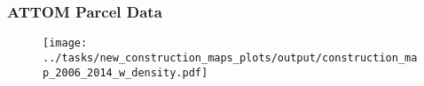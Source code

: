 \begin{frame}
    \frametitle{ATTOM Parcel Data} 
        \begin{figure}
            \centering
            \texttt{[image: ../tasks/new\_construction\_maps\_plots/output/construction\_map\_2006\_2014\_w\_density.pdf]}
            \label{fig:alderman_effects}
        \end{figure}
 \end{frame} 






